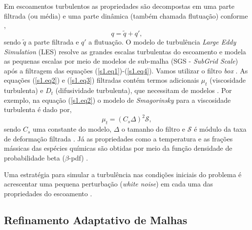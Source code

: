 \documentclass[12pt, brazil]{article}
\begin{document}
Em escoamentos turbulentos as propriedades são decompostas em uma parte filtrada (ou média) e uma parte dinâmica (também chamada flutuação) conforme \cite{POI05,POP01,VER07},
\begin{equation}
  q = \tilde{q}+q',
\end{equation}
sendo $\tilde{q}$ a parte filtrada e $q'$ a flutuação. O modelo de turbulência {\it Large Eddy Simulation} (LES) resolve as grandes escalas turbulentas do escoamento e modela as pequenas escalas por meio de modelos de sub-malha (SGS - {\it SubGrid Scale}) após a filtragem das equações (\ref{s1.eq1})-(\ref{s1.eq4}). Vamos utilizar o filtro {\it box} \cite{CAL12,POP01,VER07}. As equações (\ref{s1.eq2}) e (\ref{s1.eq3}) filtradas contém termos adicionais $\mu_t$ (viscosidade turbulenta) e $D_t$ (difusividade turbulenta), que necessitam de modelos \cite{CAL12,FER03,POP01}. Por exemplo, na equação (\ref{s1.eq2}) o modelo de {\it Smagorinsky} para a viscosidade turbulenta é dado por,
\begin{equation}
  \mu_t = (C_s\Delta)^2\mathcal{S},
\end{equation}
sendo $C_s$ uma constante do modelo, $\Delta$ o tamanho do filtro  e $\mathcal{S}$ é módulo da taxa de deformação filtrada \cite{CAL12, POP01}. Já as propriedades como a temperatura e as frações mássicas das espécies químicas são obtidas por meio da função densidade de probabilidade beta ($\beta$-pdf) \cite{CAL12,POI05,VER07}. 

Uma estratégia para simular a turbulência nas condições iniciais do problema é acrescentar uma pequena perturbação ({\it white noise}) em cada uma das propriedades do escoamento \cite{POP01}.


\subsection{Refinamento Adaptativo de Malhas}
\end{document}
